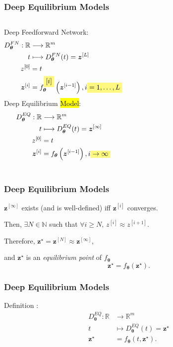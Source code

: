\documentclass[t]{beamer}
\newcommand{\R}{\mathbb{R}}
\newcommand{\N}{\mathbb{N}}
\newcommand{\highlight}[1]{%
  \colorbox{yellow!50}{$\displaystyle#1$}}
\begin{document}
\begin{frame}
    \frametitle{Deep Equilibrium Models}
    \begin{columns}
	Deep Feedforward Network:
	\begin{align*}
	    D^{FN}_{\bm{\theta}}: \R &\longrightarrow \R^{m} \\
	    t &\longmapsto 	D^{FN}_{\bm{\theta}}(	t) = \bm{z}^{[L]} \\
	    z^{[0]} &= t \\
	    \bm{z}^{[i]} &= f^{\highlight{[i]}}_{\bm{\theta}}\left( \bm{z}^{[i-1]} \right) , i\highlight{=1,\ldots,L}
	\end{align*} \pause
	Deep Equilibrium \hl{Model}:
	\begin{align*}
	    D^{EQ}_{\bm{\theta}}: \R &\longrightarrow \R^{m} \\
	    t &\longmapsto 	D^{EQ}_{\bm{\theta}}(	t) = \bm{z}^{[\infty]} \\
	    z^{[0]} &= t \\
	    \bm{z}^{[i]} &= f_{\bm{\theta}}\left( \bm{z}^{[i-1]} \right) , i\highlight{\to \infty}
	\end{align*}
    \end{columns}
\end{frame}

\begin{frame}
    \frametitle{Deep Equilibrium Models}
    $\bm{z}^{[\infty]}$ exists (and is well-defined) iff $\bm{z}^{[i]}$ converges.
    \linebreak \pause

    Then, $\exists N\in \N$ such that $\forall i\ge N,\,z^{[i]}\approx z^{[i+1]}$.
    \linebreak \pause

    Therefore, $\bm{z}^{\star}=\bm{z}^{[N]}\approx \bm{z}^{[\infty]}$,
    \linebreak \pause

    and $\bm{z}^{\star}$ is an \emph{equilibrium point} of $f_{\bm{\theta}}$ \[
	    \bm{z}^{\star} = f_{\bm{\theta}}\left( \bm{z}^{\star} \right)
    .\] 
\end{frame}

\begin{frame}
    \frametitle{Deep Equilibrium Models}
    Definition \cite{Bai2019}:
    \begin{align*}
	D^{EQ}_{\bm{\theta}}: \R &\longrightarrow \R^{m} \\
	t &\longmapsto 	D^{EQ}_{\bm{\theta}}(	t) = \bm{z}^{\star} \\
	\bm{z}^{\star} &= f_{\bm{\theta}}\left( t, \bm{z}^{\star} \right)
    .\end{align*}
\end{frame}
\end{document}
